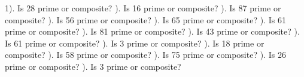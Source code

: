 \documentclass{article}%
\begin{document}
1). Is 28 prime or composite?%
\newline%
\newline%
). Is 16 prime or composite?%
\newline%
\newline%
). Is 87 prime or composite?%
\newline%
\newline%
). Is 56 prime or composite?%
\newline%
\newline%
). Is 65 prime or composite?%
\newline%
\newline%
). Is 61 prime or composite?%
\newline%
\newline%
). Is 81 prime or composite?%
\newline%
\newline%
). Is 43 prime or composite?%
\newline%
\newline%
). Is 61 prime or composite?%
\newline%
\newline%
). Is 3 prime or composite?%
\newline%
\newline%
). Is 18 prime or composite?%
\newline%
\newline%
). Is 58 prime or composite?%
\newline%
\newline%
). Is 75 prime or composite?%
\newline%
\newline%
). Is 26 prime or composite?%
\newline%
\newline%
). Is 3 prime or composite?%
\newline%
\end{document}
